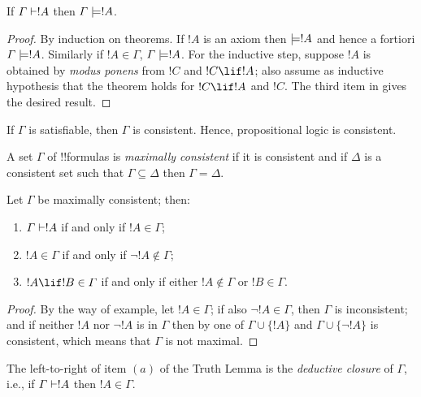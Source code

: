 \documentclass[../../include/open-logic-section]{subfiles}
\begin{document}


\begin{thm}[Soundness] 
If $\Gamma\Proves!A$ then
$\Gamma \Entails !A$. 
\end{thm}

\begin{proof} 
By induction on theorems. If $!A$ is an axiom then $\Entails
!A$ and hence a fortiori $\Gamma \Entails!A$. Similarly if $!A \in \Gamma$,
$\Gamma \Entails!A$. For the inductive step, suppose $!A$ is obtained by
\emph{modus ponens} from $!C$ and $!C\lif!A$; also assume as inductive
hypothesis that the theorem holds for $!C\lif !A$ and $!C$. The third item
in  gives the desired result. 
\end{proof}

\begin{cor} 
If $\Gamma$ is satisfiable, then $\Gamma$ is consistent. Hence,
propositional logic is consistent. 
\end{cor}

\begin{defn} 
A set $\Gamma$ of !!{formula}s is \emph{maximally consistent} if it is
consistent and if $\Delta$ is a consistent set such that $\Gamma
\subseteq \Delta$ then $\Gamma = \Delta$.
\end{defn}

\begin{prop} 
Let $\Gamma$ be maximally consistent; then: 
\begin{enumerate} 
\item $\Gamma\Proves!A$ if and only if $!A\in\Gamma$; 
\item $!A\in\Gamma$ if and only if $\lnot!A\notin\Gamma$;
\item $!A\lif!B \in\Gamma$ if and only if either $!A\notin\Gamma$ or
$!B\in\Gamma$. 
\end{enumerate} 
\end{prop} 


\begin{proof} 
By the way of example, let $!A\in\Gamma$; if also $\lnot!A\in\Gamma$,
then $\Gamma$ is inconsistent; and if neither $!A$ nor $\lnot!A$ is in
$\Gamma$ then by  one of $\Gamma\cup\{!A\}$
and $\Gamma\cup\{\lnot!A\}$ is consistent, which means that $\Gamma$
is not maximal. 
\end{proof}

The left-to-right of item $(a)$ of the Truth Lemma is the
\emph{deductive closure} of $\Gamma$, i.e., if $\Gamma \Proves !A$ then $!A
\in \Gamma$.
\end{document}
